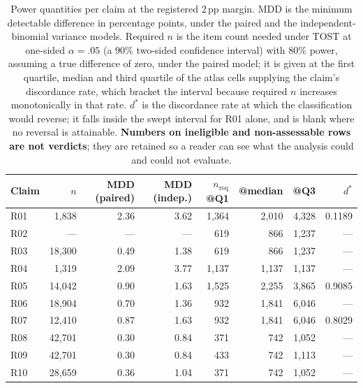 \begin{table}[!t]
\centering
\scriptsize
\caption{Power quantities per claim at the registered 2\,pp margin. MDD is the minimum detectable difference in percentage points, under the paired and the independent-binomial variance models. Required $n$ is the item count needed under TOST at one-sided $\alpha=.05$ (a 90\% two-sided confidence interval) with 80\% power, assuming a true difference of zero, under the paired model; it is given at the first quartile, median and third quartile of the atlas cells supplying the claim's discordance rate, which bracket the interval because required $n$ increases monotonically in that rate. $d^{*}$ is the discordance rate at which the classification would reverse; it falls inside the swept interval for R01 alone, and is blank where no reversal is attainable. \textbf{Numbers on ineligible and non-assessable rows are not verdicts}; they are retained so a reader can see what the analysis could and could not evaluate.}
\label{tab:audit-power}
\begin{tabular}{@{}lrrrrrrr@{}}
\toprule
Claim & $n$ & MDD (paired) & MDD (indep.) & $n_{\mathrm{req}}$@Q1 & @median & @Q3 & $d^{*}$ \\
\midrule
R01 & 1{,}838 & 2.36 & 3.62 & 1{,}364 & 2{,}010 & 4{,}328 & 0.1189 \\
R02 & --- & --- & --- & 619 & 866 & 1{,}237 & --- \\
R03 & 18{,}300 & 0.49 & 1.38 & 619 & 866 & 1{,}237 & --- \\
R04 & 1{,}319 & 2.09 & 3.77 & 1{,}137 & 1{,}137 & 1{,}137 & --- \\
R05 & 14{,}042 & 0.90 & 1.63 & 1{,}525 & 2{,}255 & 3{,}865 & 0.9085 \\
R06 & 18{,}904 & 0.70 & 1.36 & 932 & 1{,}841 & 6{,}046 & --- \\
R07 & 12{,}410 & 0.87 & 1.63 & 932 & 1{,}841 & 6{,}046 & 0.8029 \\
R08 & 42{,}701 & 0.30 & 0.84 & 371 & 742 & 1{,}052 & --- \\
R09 & 42{,}701 & 0.30 & 0.84 & 433 & 742 & 1{,}113 & --- \\
R10 & 28{,}659 & 0.36 & 1.04 & 371 & 742 & 1{,}052 & --- \\

\end{tabular}
\end{table}

